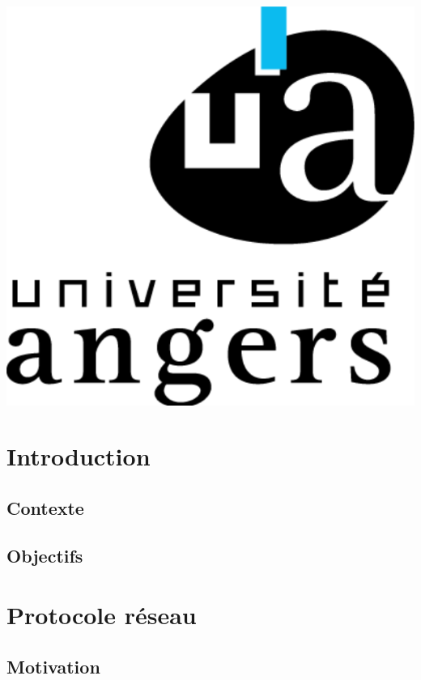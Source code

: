\documentclass{report}
\begin{document}
\begin{titlepage}
		
	\vspace{1.5cm}
	\hspace{15cm}\includegraphics[scale = 0.1]{img/logo.png}

    
    
\end{titlepage}


\tableofcontents

\chapter{Introduction}

	\section{Contexte}
		 \label{contexte}
	
	\section{Objectifs}
		 \label{objectifs}

\chapter{Protocole réseau}
		
	\section{Motivation}
		 \label{motivation}
\end{document}
